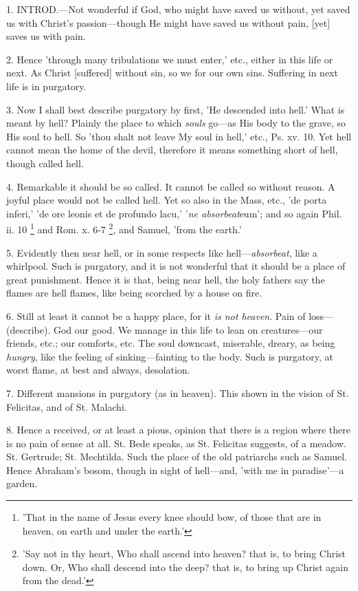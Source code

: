 
1. INTROD.—Not
wonderful if God, who might have saved us without, yet saved us with
Christ's passion—though He might have saved us without pain, [yet]
saves us with pain.

2. Hence 'through many tribulations we must
enter,' etc., either in this life or next. As Christ [suffered]
without sin, so we for our own sins. Suffering in next life is in
purgatory.

3. Now I shall best describe purgatory by first,
'He descended into hell.' What is meant by hell? Plainly the place to
which \emph{souls} go—as His body to the grave, so His soul to hell.
So 'thou shalt not leave My soul in hell,' etc., Ps. xv. 10. Yet hell
cannot mean the home of the devil, therefore it means something short
of hell, though called hell.

4. Remarkable it should be so called. It cannot
be called so without reason. A joyful place would not be called hell.
Yet so also in the Mass, etc., 'de porta inferi,' 'de ore leonis et de
profundo lacu,' '\emph{ne absorbeat}eum'; and so again Phil. ii. 10 \footnote{'That in the name of
Jesus every knee should bow, of those that are in heaven, on earth and
under the earth.'} and Rom. x. 6-7 \footnote{'Say not in thy heart,
Who shall ascend into heaven? that is, to bring Christ down. Or, Who
shall descend into the deep? that is, to bring up Christ again from
the dead.'},
and Samuel, 'from the earth.'

5. Evidently then near hell, or in some respects
like hell—\emph{absorbeat}, like a whirlpool. Such is purgatory, and
it is not wonderful that it should be a place of great punishment.
Hence it is that, being near hell, the holy fathers say the flames are
hell flames, like being scorched by a house on fire.

6. Still at least it cannot be a happy place, for
it \emph{is not heaven}. Pain of loss—(describe). God our good. We
manage in this life to lean on creatures—our friends, etc.; our
comforts, etc. The soul downcast, miserable, dreary, as being \emph{hungry},
like the feeling of sinking—fainting to the body. Such is
purgatory, at worst flame, at best and always, desolation.

7. Different mansions in purgatory (as in
heaven). This shown in the vision of St. Felicitas, and of St.
Malachi.

8. Hence a received, or at least a pious, opinion
that there is a region where there is no pain of sense at all. St.
Bede speaks, as St. Felicitas suggests, of a meadow. St. Gertrude; St.
Mechtilda. Such the place of the old patriarchs such as Samuel. Hence
Abraham's bosom, though in sight of hell—and, 'with me in
paradise'—a garden.

